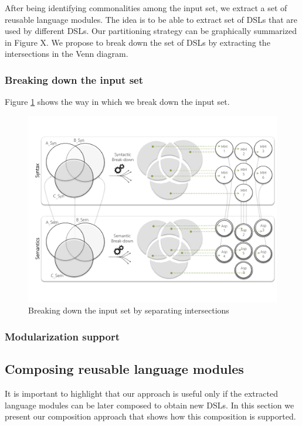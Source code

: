 After being identifying commonalities among the input set, we extract a set of reusable language modules. The idea is to be able to extract set of DSLs that are used by different DSLs. Our partitioning strategy can be graphically summarized in Figure X. We propose to break down the set of DSLs by extracting the intersections in the Venn diagram. 

\subsubsection{Breaking down the input set}

Figure \ref{fig:breakingdown} shows the way in which we break down the input set. 

\begin{figure}
\centering
\includegraphics[width=1.05\linewidth]{images/breakdown.pdf}
\caption{Breaking down the input set by separating intersections}
\label{fig:breakingdown}
\end{figure}

\subsubsection{Modularization support}

\subsection{Composing reusable language modules}

It is important to highlight that our approach is useful only if the extracted language modules can be later composed to obtain new DSLs. In this section we present our composition approach that shows how this composition is supported. 
